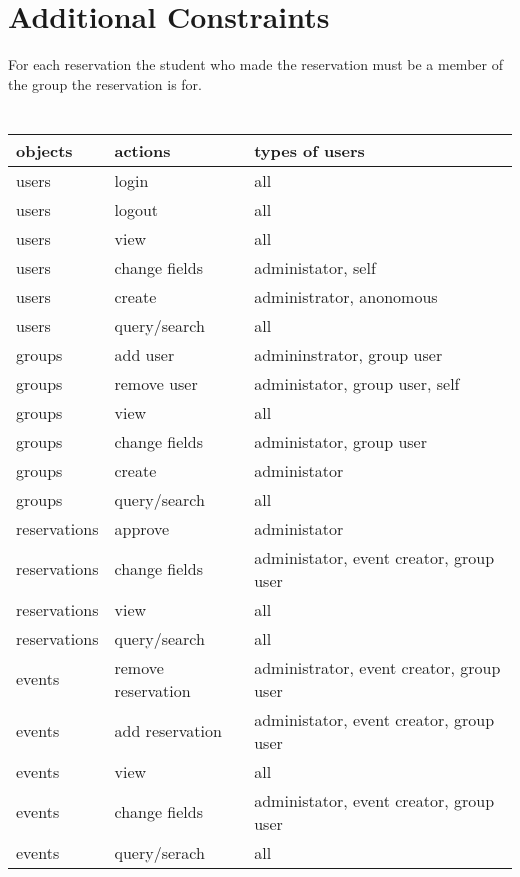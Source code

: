 \documentclass{article}
\begin{document}
\section{}

\section{Additional Constraints}
For each reservation the student who made the reservation must be a member of
the group the reservation is for. 

\section{}

\begin{tabular}{lll}
\toprule
 objects & actions & types of users\\
\midrule
 users & login & all \\
users & logout & all \\
users & view & all \\
users & change fields & administator, self \\
users & create & administrator, anonomous \\
users & query/search & all \\
groups & add user & admininstrator, group user\\
groups & remove user & administator, group user, self\\ 
groups & view & all\\
groups & change fields & administator, group user\\
groups & create & administator \\
groups & query/search & all \\
reservations & approve & administator \\
reservations & change fields & administator, event creator, group user \\
reservations & view & all \\
reservations & query/search & all \\
events & remove reservation & administrator, event creator, group user \\
events & add reservation & administator, event creator, group user\\
events & view & all \\
events & change fields & administator, event creator, group user \\
events & query/serach & all \\
\bottomrule
\end{tabular}
\end{document}
